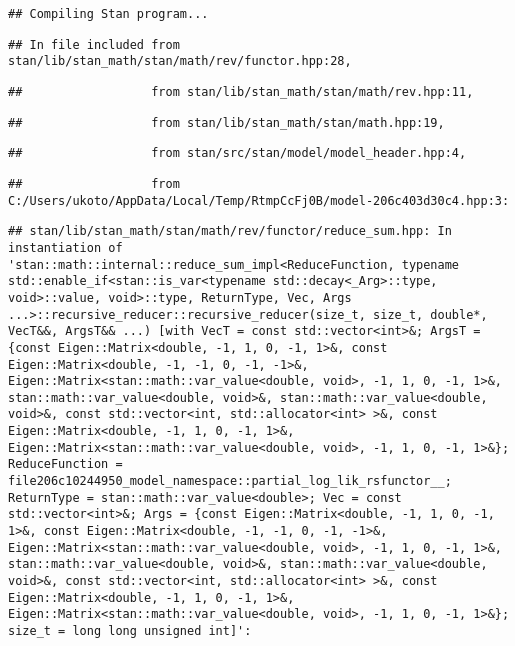 \documentclass[
]{article}
\begin{document}
\begin{verbatim}
## Compiling Stan program...
\end{verbatim}

\begin{verbatim}
## In file included from stan/lib/stan_math/stan/math/rev/functor.hpp:28,
\end{verbatim}

\begin{verbatim}
##                  from stan/lib/stan_math/stan/math/rev.hpp:11,
\end{verbatim}

\begin{verbatim}
##                  from stan/lib/stan_math/stan/math.hpp:19,
\end{verbatim}

\begin{verbatim}
##                  from stan/src/stan/model/model_header.hpp:4,
\end{verbatim}

\begin{verbatim}
##                  from C:/Users/ukoto/AppData/Local/Temp/RtmpCcFj0B/model-206c403d30c4.hpp:3:
\end{verbatim}

\begin{verbatim}
## stan/lib/stan_math/stan/math/rev/functor/reduce_sum.hpp: In instantiation of 'stan::math::internal::reduce_sum_impl<ReduceFunction, typename std::enable_if<stan::is_var<typename std::decay<_Arg>::type, void>::value, void>::type, ReturnType, Vec, Args ...>::recursive_reducer::recursive_reducer(size_t, size_t, double*, VecT&&, ArgsT&& ...) [with VecT = const std::vector<int>&; ArgsT = {const Eigen::Matrix<double, -1, 1, 0, -1, 1>&, const Eigen::Matrix<double, -1, -1, 0, -1, -1>&, Eigen::Matrix<stan::math::var_value<double, void>, -1, 1, 0, -1, 1>&, stan::math::var_value<double, void>&, stan::math::var_value<double, void>&, const std::vector<int, std::allocator<int> >&, const Eigen::Matrix<double, -1, 1, 0, -1, 1>&, Eigen::Matrix<stan::math::var_value<double, void>, -1, 1, 0, -1, 1>&}; ReduceFunction = file206c10244950_model_namespace::partial_log_lik_rsfunctor__; ReturnType = stan::math::var_value<double>; Vec = const std::vector<int>&; Args = {const Eigen::Matrix<double, -1, 1, 0, -1, 1>&, const Eigen::Matrix<double, -1, -1, 0, -1, -1>&, Eigen::Matrix<stan::math::var_value<double, void>, -1, 1, 0, -1, 1>&, stan::math::var_value<double, void>&, stan::math::var_value<double, void>&, const std::vector<int, std::allocator<int> >&, const Eigen::Matrix<double, -1, 1, 0, -1, 1>&, Eigen::Matrix<stan::math::var_value<double, void>, -1, 1, 0, -1, 1>&}; size_t = long long unsigned int]':
\end{verbatim}
\end{document}
